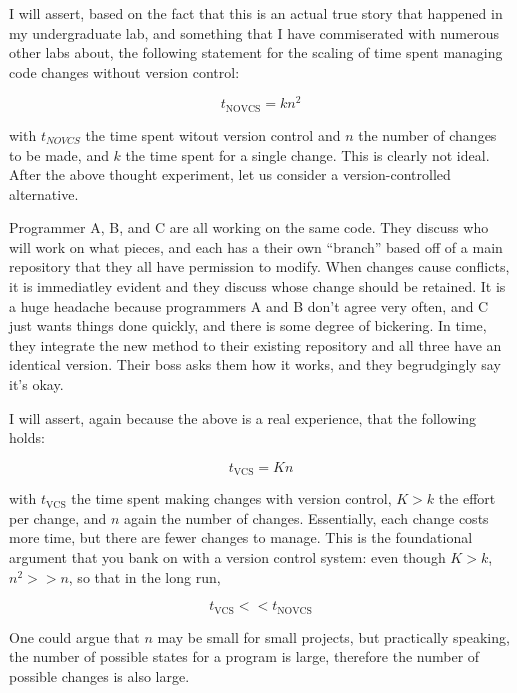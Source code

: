 \par{
I will assert, based on the fact that this is an actual true story that
happened in my undergraduate lab, and something that I have commiserated with
numerous other labs about, the following statement for the scaling of
time spent managing code changes without version control:

\begin{equation}
t_{\text{NOVCS}} = k n^2
\end{equation}

with $t_{NOVCS}$ the time spent witout version control 
and $n$ the number of changes to be made, and
$k$ the time spent for a single change. This
is clearly not ideal. After the above thought experiment, let us consider a
version-controlled alternative.
}

\par{
Programmer A, B, and C are all working on the same code. They discuss who will
work on what pieces, and each has a their own ``branch'' based off of a main
repository that they all have permission to modify. When changes cause
conflicts, it is immediatley evident and they discuss whose change should be
retained. It is a huge headache because programmers A and B don't agree very
often, and C just wants things done quickly, and there is some degree of
bickering. In time, they integrate the new method to their existing repository
and all three have an identical version. Their boss asks them how it works,
and they begrudgingly say it's okay. 
}

\par{
I will assert, again because the above is a real experience, that the
following holds:

\begin{equation}
t_{\text{VCS}} = K n
\end{equation}

with $t_{\text{VCS}}$ the time spent making changes with version control, 
$K > k$ the effort per change, and $n$ again the number of changes.
Essentially, each change costs more time, but there are fewer changes to
manage. This is the foundational argument that you bank on with a version
control system: even though $K > k$, $n^2 >> n$, so that in the long run,

\begin{equation}
t_{\text{VCS}} << t_{\text{NOVCS}}
\end{equation}

One could argue that $n$ may be small for small projects, but practically
speaking, the number of possible states for a program is large, therefore the
number of possible changes is also large. 
}

